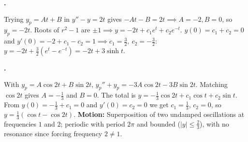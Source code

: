 \documentclass[10pt]{scrartcl}
\begin{document}
\begin{prob}
  \textbf{.}\par{}
  \begin{steps}
    \ii Trying $y_p=At+B$ in $y''-y=2t$ gives $-At-B=2t\implies A=-2, B=0$, so $y_p=-2t$.
    \ii Roots of $r^2-1$ are $\pm 1\implies y=-2t+c_1e^t+c_2e^{-t}$.
    \ii $y(0)=c_1+c_2=0$ and $y'(0)=-2+c_1-c_2=1\implies c_1=\frac32,\ c_2=-\frac32$: $y=-2t+\frac32(e^t-e^{-t})=-2t+3\sinh t$.
  \end{steps}
\end{prob}

\begin{prob}
  \textbf{.}\par{}
  \begin{steps}
    \ii With $y_p=A\cos 2t+B\sin 2t$, $y_p''+y_p=-3A\cos 2t-3B\sin 2t$. Matching $\cos 2t$ gives $A=-\frac13$ and $B=0$.
    \ii The total is $y=-\frac13\cos 2t+c_1\cos t+c_2\sin t$. From $y(0)=-\frac13+c_1=0$ and $y'(0)=c_2=0$ we get $c_1=\frac13$, $c_2=0$, so $y=\frac13(\cos t-\cos 2t)$.
    \ii \textbf{Motion:} Superposition of two undamped oscillations at frequencies $1$ and $2$; periodic with period $2\pi$ and bounded ($|y|\le \frac23$), with no resonance since forcing frequency $2\neq 1$.
  \end{steps}
\end{prob}
\end{document}
